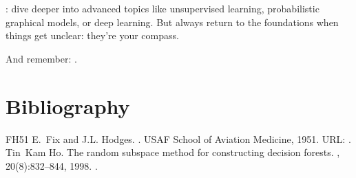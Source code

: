 \documentclass[letterpaper,10pt,english]{jupyterBook}
\begin{document}
\sphinxAtStartPar
{}: dive deeper into advanced topics like unsupervised learning, probabilistic graphical models, or deep learning. But always return to the foundations when things get unclear: they’re your compass.

\sphinxAtStartPar
And remember: .

\sphinxstepscope


\chapter{Bibliography}
\label{\detokenize{bibliography:bibliography}}\label{\detokenize{bibliography::doc}}
\begin{sphinxthebibliography}{FH51}
\sphinxAtStartPar
E. Fix and J.L. Hodges. . USAF School of Aviation Medicine, 1951. URL: .
\sphinxAtStartPar
Tin Kam Ho. The random subspace method for constructing decision forests. , 20(8):832–844, 1998. .
\end{sphinxthebibliography}







\renewcommand{\indexname}{Index}
\printindex
\end{document}

